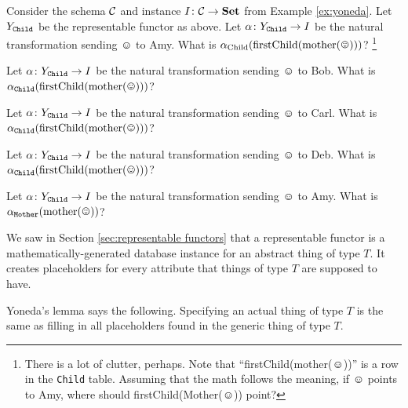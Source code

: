 \documentclass[CT4S-EN-RU]{subfiles}
\begin{document}
\begin{exerciseENG}
Consider the schema $\mathcal{C}$ and instance $I\colon\mathcal{C}\rightarrow{\mathbf{Set}}$ from Example \ref{ex:yoneda}. Let $Y_{\tt Child}$ be the representable functor as above. 
\sexc Let $\alpha\colon Y_{\tt Child}\rightarrow I$ be the natural transformation sending $\smiley$ to Amy. What is $\alpha_{\tn{Child}}(\tn{firstChild(mother}(\smiley)))$?
\footnote{There is a lot of clutter, perhaps. Note that “firstChild(mother($\smiley$))” is a row in the {\tt Child} table. Assuming that the math follows the meaning, if $\smiley$ points to Amy, where should firstChild(Mother($\smiley$)) point?}
\item Let $\alpha\colon Y_{\tt Child}\rightarrow I$ be the natural transformation sending $\smiley$ to Bob. What is $\alpha_{\tt Child}(\tn{firstChild(mother}(\smiley)))$?
\item Let $\alpha\colon Y_{\tt Child}\rightarrow I$ be the natural transformation sending $\smiley$ to Carl. What is $\alpha_{\tt Child}(\tn{firstChild(mother}(\smiley)))$?
\item Let $\alpha\colon Y_{\tt Child}\rightarrow I$ be the natural transformation sending $\smiley$ to Deb. What is $\alpha_{\tt Child}(\tn{firstChild(mother}(\smiley)))$?
\item Let $\alpha\colon Y_{\tt Child}\rightarrow I$ be the natural transformation sending $\smiley$ to Amy. What is $\alpha_{\tt Mother}(\tn{mother}(\smiley))$?
\endsexc
\end{exerciseENG}

\begin{exerciseRUS}
\end{exerciseRUS}

\begin{blockENG}
We saw in Section \ref{sec:representable functors} that a representable functor is a mathematically-generated database instance for an abstract thing of type $T$. It creates placeholders for every attribute that things of type $T$ are supposed to have.
\end{blockENG}

\begin{blockRUS}
\end{blockRUS}

\begin{sloganENG}
Yoneda's lemma says the following. Specifying an actual thing of type $T$ is the same as filling in all placeholders found in the generic thing of type $T$.
\end{sloganENG}

\begin{sloganRUS}
\end{sloganRUS}
\end{document}
